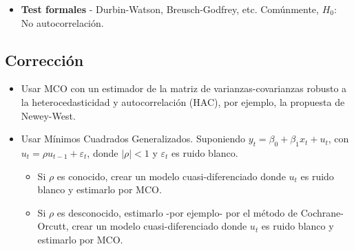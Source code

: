 \documentclass[10pt, a4paper, landscape]{article}
\begin{document}
\begin{multicols}{3}
\begin{itemize}[leftmargin=*]
			\item \textbf{Test formales} - Durbin-Watson, Breusch-Godfrey, etc. Comúnmente, $H_{0}$: No autocorrelación.
		\end{itemize}
		
		\subsection*{Corrección}
		
		\begin{itemize}[leftmargin=*]
			\item Usar MCO con un estimador de la matriz de varianzas-covarianzas robusto a la heterocedasticidad y autocorrelación (HAC), por ejemplo, la propuesta de Newey-West.
			\item Usar Mínimos Cuadrados Generalizados. Suponiendo $y_{t} = \beta_{0} + \beta_{1} x_{t} + u_{t}$, con $u_{t} = \rho u_{t - 1} + \varepsilon_{t}$, donde $\lvert \rho \rvert < 1$ y $\varepsilon_{t}$ es ruido blanco.
			
			\begin{itemize}[leftmargin=*]
				\item Si $\rho$ es conocido, crear un modelo cuasi-diferenciado donde $u_{t}$ es ruido blanco y estimarlo por MCO.
				\item Si $\rho$ es desconocido, estimarlo -por ejemplo- por el método de Cochrane-Orcutt, crear un modelo cuasi-diferenciado donde $u_{t}$ es ruido blanco y estimarlo por MCO.
			\end{itemize}
		\end{itemize}
	\end{multicols}
\end{document}

